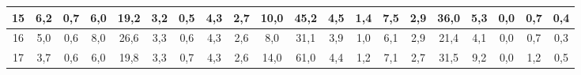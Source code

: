 \begin{sidewaystable}[]
\begin{tabular}{|c|c|c|c|c|c|c|c|c|c|c|c|c|c|c|c|c|c|c|c|}
    15 & 6,2                                              & 0,7                                              & 6,0                                              & 19,2                                             & 3,2                                              & 0,5                                              & 4,3                                              & 2,7                                              & 10,0                                             & 45,2                                             & 4,5                                              & 1,4                                              & 7,5                                              & 2,9                                              & 36,0                                             & 5,3                                              & 0,0                                              & 0,7                                              & 0,4                                              \\ \hline
    16 & 5,0                                              & 0,6                                              & 8,0                                              & 26,6                                             & 3,3                                              & 0,6                                              & 4,3                                              & 2,6                                              & 8,0                                              & 31,1                                             & 3,9                                              & 1,0                                              & 6,1                                              & 2,9                                              & 21,4                                             & 4,1                                              & 0,0                                              & 0,7                                              & 0,3                                              \\ \hline
    17 & 3,7                                              & 0,6                                              & 6,0                                              & 19,8                                             & 3,3                                              & 0,7                                              & 4,3                                              & 2,6                                              & 14,0                                             & 61,0                                             & 4,4                                              & 1,2                                              & 7,1                                              & 2,7                                              & 31,5                                             & 9,2                                              & 0,0                                              & 1,2                                              & 0,5                                              \\ \hline

\end{tabular}
\end{sidewaystable}
